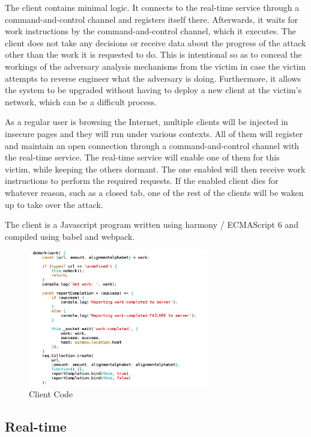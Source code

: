 The client contains minimal logic. It connects to the real-time service through
a command-and-control channel and registers itself there. Afterwards, it waits
for work instructions by the command-and-control channel, which it executes.
The client does not take any decisions or receive data about the progress of
the attack other than the work it is requested to do. This is intentional so as
to conceal the workings of the adversary analysis mechanisms from the victim in
case the victim attempts to reverse engineer what the adversary is doing.
Furthermore, it allows the system to be upgraded without having to deploy a new
client at the victim's network, which can be a difficult process.

As a regular user is browsing the Internet, multiple clients will be injected
in insecure pages and they will run under various contexts. All of them will
register and maintain an open connection through a command-and-control channel
with the real-time service. The real-time service will enable one of them for
this victim, while keeping the others dormant. The one enabled will then
receive work instructions to perform the required requests. If the enabled
client dies for whatever reason, such as a closed tab, one of the rest of the
clients will be waken up to take over the attack.

The client is a Javascript program written using harmony / ECMAScript 6 and
compiled using babel and webpack.

\begin{figure}[H] \caption{Client Code} \centering
\includegraphics[width=0.7\textwidth]{diagrams/client.png}\end{figure}

\subsection{Real-time}

